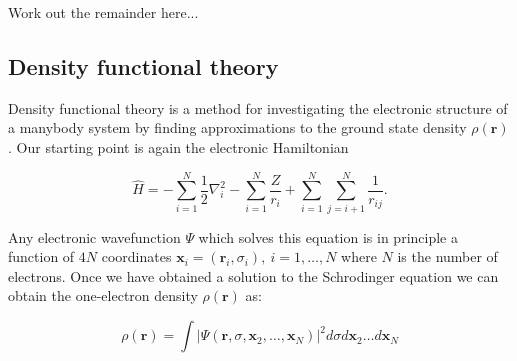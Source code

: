 Work out the remainder here...

\subsection{Density functional theory}
Density functional theory is a method for
investigating the electronic structure of a manybody system
by finding approximations to the ground state
density $\rho(\bm{r})$. Our starting point
is again the electronic Hamiltonian

\begin{equation}
    \hat{H} = -\sum_{i=1}^N \frac{1}{2} \nabla_i^2
    - \sum_{i=1}^N \frac{Z}{r_{i}} + \sum_{i=1}^N \sum_{j=i+1}^N
    \frac{1}{r_{ij}} .
\end{equation}

Any electronic wavefunction $\Psi$ which solves this equation
is in principle a function of $4N$ coordinates $\bm{x}_i = (\bm{r}_i, \sigma_i)
, \ i=1,\dots,N$
where $N$ is the number of electrons.
Once we have obtained a solution to the Schrodinger equation
we can obtain the one-electron density $\rho(\bm{r})$ as:

\begin{equation}
    \rho(\bm{r}) = \int \left| \Psi(\bm{r}, \sigma, \bm{x}_2,\dots,\bm{x}_N)
    \right|^2 d\sigma d\bm{x}_2 \dots d\bm{x}_N
\end{equation}
